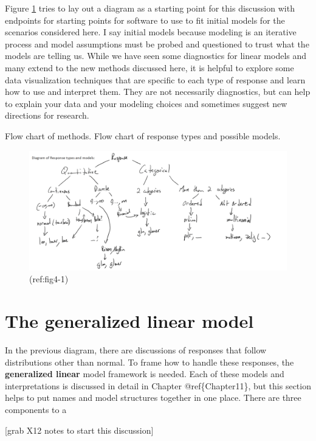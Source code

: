 \documentclass[
]{book}
\begin{document}
Figure \ref{fig:Figure4-1} tries to lay out a diagram as a starting point for this discussion with endpoints for starting points for software to use to fit initial models for the scenarios considered here. I say initial models because modeling is an iterative process and model assumptions must be probed and questioned to trust what the models are telling us. While we have seen some diagnostics for linear models and many extend to the new methods discussed here, it is helpful to explore some data visualization techniques that are specific to each type of response and learn how to use and interpret them. They are not necessarily diagnostics, but can help to explain your data and your modeling choices and sometimes suggest new directions for research.

Flow chart of methods. Flow chart of response types and possible models.

\begin{figure}[ht!]

{\centering \includegraphics[width=0.75\linewidth]{responsediagram} 

}

\caption{(ref:fig4-1)}\label{fig:Figure4-1}
\end{figure}

\hypertarget{section4-2}{%
\section{The generalized linear model}\label{section4-2}}

In the previous diagram, there are discussions of responses that follow distributions other than normal. To frame how to handle these responses, the \textbf{generalized linear} model framework is needed. Each of these models and interpretations is discussed in detail in Chapter @ref\{Chapter11\}, but this section helps to put names and model structures together in one place. There are three components to a

{[}grab X12 notes to start this discussion{]}
\end{document}
